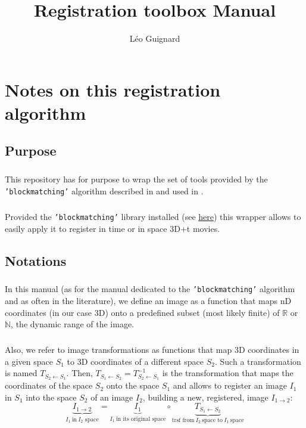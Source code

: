 \documentclass[10pt,a4paper]{book}
\author{L\'eo Guignard}
\title{Registration toolbox Manual}
\newcommand{\option}[1]{{\texttt{'#1'}}}
\newcommand{\T}[2]{T_{{#1}\leftarrow{#2}}}
\begin{document}
\maketitle
\tableofcontents
\chapter{Notes on this registration algorithm}
\section{Purpose}
\paragraph{}This repository has for purpose to wrap the set of tools provided by the \option{blockmatching} algorithm described in \citep{Ourselin:2000aa} and used in \citep{McDole:2018aa,Guignard:2017aa,Guignard:2014aa}.
\paragraph{}Provided the \option{blockmatching} library installed (see \href{https://gitlab.inria.fr/greg/Klab-BlockMatching}{\underline{here}}) this wrapper allows to easily apply it to register in time or in space 3D+t movies.
\section{Notations}
\paragraph{}In this manual (as for the manual dedicated to the \option{blockmatching} algorithm and as often in the literature), we define an image as a function that maps nD coordinates (in our case 3D) onto a predefined subset (most likely finite) of $\mathbb{R}$ or $\mathbb{N}$, the dynamic range of the image.
\paragraph{}Also, we refer to image transformations as functions that map 3D coordinates in a given space $S_1$ to 3D coordinates of a different space $S_2$. Such a transformation is named $\T{S_2}{S_1}$. Then, $\T{S_1}{S_2}=\T{S_2}{S_1}^{-1}$ is the transformation that maps the coordinates of the space $S_2$ onto the space $S_1$ and allows to register an image $I_1$ in $S_1$ into the space $S_2$ of an image $I_2$, building a new, registered, image $I_{1\rightarrow 2}$:
\begin{equation*}
\underbrace{I_{1\rightarrow 2}}_{I_1~\text{in}~I_2\text{~space}} = \underbrace{I_1}_{I_1~\text{in its original space}} \circ \underbrace{\T{S_1}{S_2}}_{\text{trsf from}~I_2~\text{space to}~I_1~\text{space}}
\end{equation*}
\end{document}
